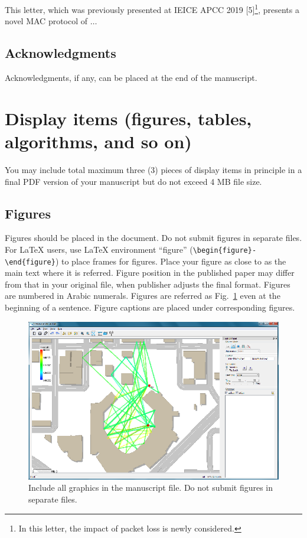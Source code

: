 \documentclass{comex}
\begin{document}
This letter, which was previously presented at IEICE APCC 2019 [5]\footnote{In this letter, the impact of packet loss is newly considered.}, 
presents a novel MAC protocol of $\ldots$


\subsection{Acknowledgments}

Acknowledgments, if any, can be placed at the end of the manuscript.

\section{Display items (figures, tables, algorithms, and so on)}

You may include total maximum three (3) pieces of display items in
principle in a final PDF version of your manuscript but do not exceed 4 MB file size.



\subsection{Figures}

Figures should be placed in the document.  Do not submit figures in
separate files.  For \LaTeX{} users, use \LaTeX{} environment ``figure'' (\verb+\begin{figure}-+\linebreak
\verb+\end{figure}+) to
place frames for figures. Place your figure as close to as the main text
where it is referred.  Figure position in the published paper may differ
from that in your original file, when publisher adjusts the final
format. Figures are numbered in Arabic numerals. Figures are referred as
Fig.~\ref{fig:scanner} even at the beginning of a sentence. Figure
captions are placed under corresponding figures.

\begin{figure}[htb]
\begin{center}
\includegraphics{f01.eps}
\end{center}
\caption{Include all graphics in the manuscript file. Do not submit
figures in separate files.}  \label{fig:scanner}
\end{figure}
\end{document}
